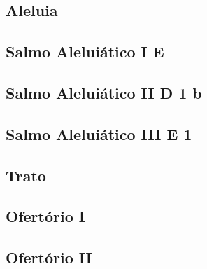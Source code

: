 \subsection{Aleluia}\label{subsection:liturgia-defunctorum/missa-pro-defunctis/alleluia}

\subsection[Salmo Aleluiático I]{Salmo Aleluiático I \textmd{E \protect\GreStar}}\label{subsection:liturgia-defunctorum/missa-pro-defunctis/psalmus-alleluiaticus-1}

\subsection[Salmo Aleluiático II]{Salmo Aleluiático II \textmd{D 1 b}}\label{subsection:liturgia-defunctorum/missa-pro-defunctis/psalmus-alleluiaticus-2}

\AllowPageFlush

\subsection[Salmo Aleluiático III]{Salmo Aleluiático III \textmd{E 1}}\label{subsection:liturgia-defunctorum/missa-pro-defunctis/psalmus-alleluiaticus-3}

\AllowPageFlush

\subsection{Trato}\label{subsection:liturgia-defunctorum/missa-pro-defunctis/tractus}

\AllowPageFlush

\subsection{Ofertório I}\label{subsection:liturgia-defunctorum/missa-pro-defunctis/offertorium-1}

\AllowPageFlush

\subsection{Ofertório II}\label{subsection:liturgia-defunctorum/missa-pro-defunctis/offertorium-2}

